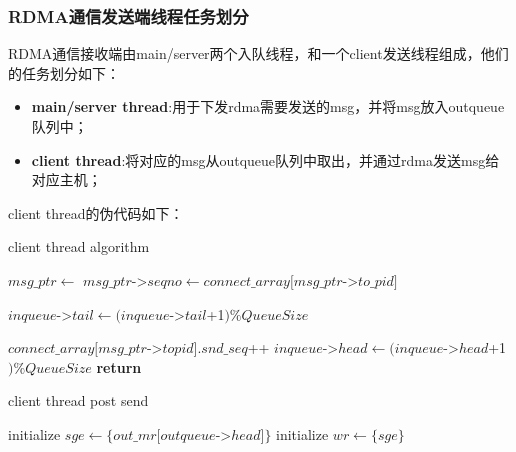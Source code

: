 {\newpage
\subsubsection{RDMA通信发送端线程任务划分}
RDMA通信接收端由main/server两个入队线程，和一个client发送线程组成，他们的任务划分如下：

\begin{itemize}[leftmargin=*, nosep]
    \item \textbf{main/server thread}:用于下发rdma需要发送的msg，并将msg放入outqueue队列中；
    \item \textbf{client thread}:将对应的msg从outqueue队列中取出，并通过rdma发送msg给对应主机；
\end{itemize}

client thread的伪代码如下：
\begin{algorithm}
    \caption{client thread algorithm}
    \begin{algorithmic}[1] %
                \State {}
                \State $msg\_ptr \gets$ 
                \State $msg\_ptr$->$seqno \gets connect\_array[msg\_ptr$->$to\_pid]$

                \State
                    \State {} 
                    \State {} 
                    \State {}
                    \State $inqueue$->$tail \gets (inqueue$->$tail$+1$) \%QueueSize$
                \Else
                    \EndWhile
                \EndIf
                
                \State
                \State $connect\_array[msg\_ptr$->$topid].snd\_seq$++
                \State $inqueue$->$head \gets (inqueue$->$head$+1$) \% QueueSize$
                \State {}
            \EndWhile
            \State \textbf{return}
        \EndProcedure
    \end{algorithmic}
\end{algorithm}


\begin{algorithm}
    \caption{client thread post send}
    \begin{algorithmic}[1] %
            \State initialize $sge \gets \{out\_mr[outqueue$->$head] \}$
            \State initialize $wr \gets \{sge\}$ 


\end{algorithmic}
\end{algorithm}}
